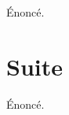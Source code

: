\begin{theorem}
  Énoncé.
\end{theorem}
\section{Suite}
\begin{proposition}
  Énoncé.
\end{proposition}
